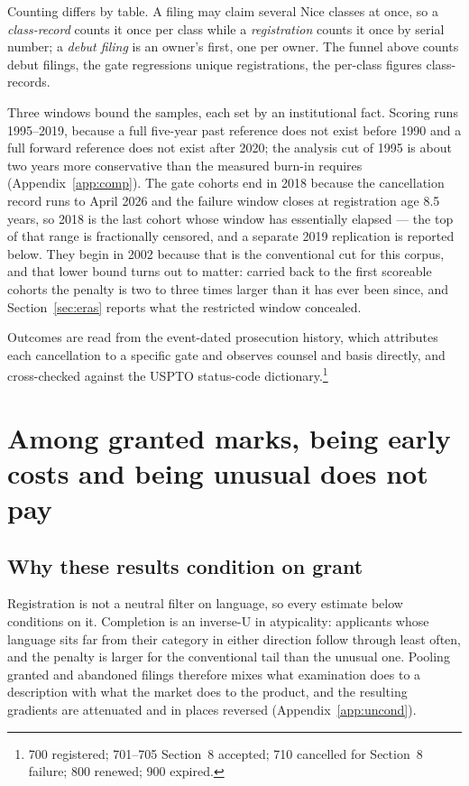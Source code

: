 Counting differs by table. A filing may claim several Nice classes at once, so
a \emph{class-record} counts it once per class while a \emph{registration}
counts it once by serial number; a \emph{debut filing} is an owner's first, one
per owner. The funnel above counts debut filings, the gate regressions unique
registrations, the per-class figures class-records.

Three windows bound the samples, each set by an institutional fact. Scoring
runs 1995--2019, because a full
five-year past reference does not exist before 1990 and a full forward
reference does not exist after 2020; the analysis cut of 1995 is about two
years more conservative than the measured burn-in requires
(Appendix~\ref{app:comp}). The gate cohorts end in 2018 because the
cancellation record runs to April 2026 and the failure window closes at
registration age 8.5 years, so 2018 is the last cohort whose window has
essentially elapsed --- the top of that range is fractionally censored, and
a separate 2019 replication is reported below. They begin in 2002 because
that is the conventional cut for this corpus, and that lower
bound turns out to matter: carried back to the first scoreable cohorts the
penalty is two to three times larger than it has ever been since, and
Section~\ref{sec:eras} reports what the restricted window concealed.

Outcomes are read from the event-dated prosecution history, which attributes
each cancellation to a specific gate and observes counsel and basis directly,
and cross-checked against the USPTO status-code dictionary.\footnote{700
registered; 701--705 Section~8 accepted; 710 cancelled for Section~8 failure;
800 renewed; 900 expired.}



\section{Among granted marks, being early costs and being unusual does not pay}\label{sec:results}

\subsection{Why these results condition on grant}

Registration is not a neutral filter on language, so every estimate below
conditions on it. Completion is an inverse-U in atypicality: applicants whose
language sits far from their category in either direction follow through least
often, and the penalty is larger for the conventional tail than the unusual
one. Pooling granted and abandoned filings therefore mixes what examination
does to a description with what the market does to the product, and the
resulting gradients are attenuated and in places reversed
(Appendix~\ref{app:uncond}).

